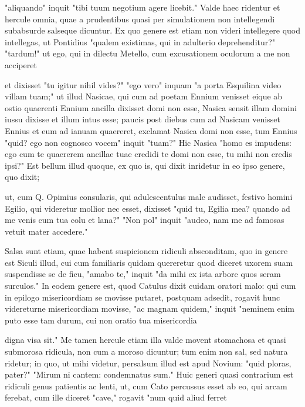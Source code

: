  "aliquando" inquit "tibi tuum negotium agere licebit." Valde haec ridentur et hercule omnia, quae a prudentibus quasi per simulationem non intellegendi subabsurde salseque dicuntur. Ex quo genere est etiam non videri intellegere quod intellegas, ut Pontidius "qualem existimas, qui in adulterio deprehenditur?" "tardum!" ut ego, qui in dilectu Metello, cum excusationem oculorum a me non acciperet

 et dixisset "tu igitur nihil vides?" "ego vero" inquam "a porta Esquilina video villam tuam;" ut illud Nasicae, qui cum ad poetam Ennium venisset eique ab ostio quaerenti Ennium ancilla dixisset domi non esse, Nasica sensit illam domini iussu dixisse et illum intus esse; paucis post diebus cum ad Nasicam venisset Ennius et eum ad ianuam quaereret, exclamat Nasica domi non esse, tum Ennius "quid? ego non cognosco vocem" inquit "tuam?" Hic Nasica "homo es impudens: ego cum te quaererem ancillae tuae credidi te domi non esse, tu mihi non credis ipsi?" Est bellum illud quoque, ex quo is, qui dixit inridetur in eo ipso genere, quo dixit;

 ut, cum Q. Opimius consularis, qui adulescentulus male audisset, festivo homini Egilio, qui videretur mollior nec esset, dixisset "quid tu, Egilia mea? quando ad me venis cum tua colu et lana?" "Non pol" inquit "audeo, nam me ad famosas vetuit mater accedere."

 Salsa sunt etiam, quae habent suspicionem ridiculi absconditam, quo in genere est Siculi illud, cui cum familiaris quidam quereretur quod diceret uxorem suam suspendisse se de ficu, "amabo te," inquit "da mihi ex ista arbore quos seram surculos." In eodem genere est, quod Catulus dixit cuidam oratori malo: qui cum in epilogo misericordiam se movisse putaret, postquam adsedit, rogavit hunc videreturne misericordiam movisse, "ac magnam quidem," inquit "neminem enim puto esse tam durum, cui non oratio tua misericordia

 digna visa sit." Me tamen hercule etiam illa valde movent stomachosa et quasi submorosa ridicula, non cum a moroso dicuntur; tum enim non sal, sed natura ridetur; in quo, ut mihi videtur, persalsum illud est apud Novium: "quid ploras, pater?" "Mirum ni cantem: condemnatus sum." Huic generi quasi contrarium est ridiculi genus patientis ac lenti, ut, cum Cato percussus esset ab eo, qui arcam ferebat, cum ille diceret "cave," rogavit "num quid aliud ferret

